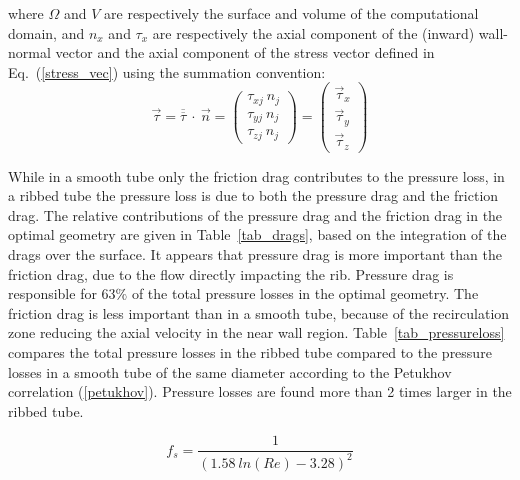 \noindent where $\Omega$ and $V$ are respectively the surface and volume of the computational domain, and $n_x$ and $\tau_x$ are respectively the axial component of the (inward) wall-normal vector and the axial component of the stress vector defined in Eq.~(\ref{stress_vec}) using the summation convention:
\begin{equation}
\vec{\tau} = \overline{\overline{\tau}} ~ \cdot ~ \vec{n} = \begin{pmatrix} \tau_{xj} ~ n_j \\ \tau_{yj} ~ n_j \\ \tau_{zj} ~ n_j \end{pmatrix} = \begin{pmatrix} \vec{\tau}_x \\ \vec{\tau}_y \\ \vec{\tau}_z \end{pmatrix}
\label{stress_vec}
\end{equation}

While in a smooth tube only the friction drag contributes to the pressure loss, in a ribbed tube the pressure loss is due to both the pressure drag and the friction drag. The relative contributions of the pressure drag and the friction drag in the optimal geometry are given in Table~\ref{tab_drags}, based on the integration of the drags over the surface. It appears that pressure drag is more important than the friction drag, due to the flow directly impacting the rib. Pressure drag is responsible for $63 \%$ of the total pressure losses in the optimal geometry. The friction drag is less important than in a smooth tube, because of the recirculation zone reducing the axial velocity in the near wall region. Table~\ref{tab_pressureloss} compares the total pressure losses in the ribbed tube compared to the pressure losses in a smooth tube of the same diameter according to the Petukhov correlation \cite{PetukhovPopov1963} (\cref{petukhov}). Pressure losses are found more than 2 times larger in the ribbed tube.

\begin{equation}
f_s = \frac{1}{(1.58 ~ ln(Re) - 3.28)^2}
\label{petukhov}
\end{equation}\\

